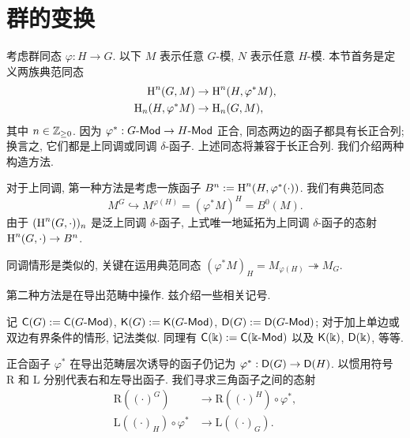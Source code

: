 \section{群的变换}\label{sec:change-of-group}
考虑群同态 $\varphi: H \to G$. 以下 $M$ 表示任意 $G$-模, $N$ 表示任意 $H$-模. 本节首务是定义两族典范同态
\begin{equation}\label{eqn:change-of-group-coh}\begin{aligned}
	\operatorname{H}^n(G, M) & \to \operatorname{H}^n(H, \varphi^* M), \\
	\operatorname{H}_n(H, \varphi^* M) & \to \operatorname{H}_n(G, M),
\end{aligned}\end{equation}
其中 $n \in \mathbb{Z}_{\geq 0}$. 因为 $\varphi^*: G\text{-}\mathsf{Mod} \to H\text{-}\mathsf{Mod}$ 正合, 同态两边的函子都具有长正合列; 换言之, 它们都是上同调或同调 $\delta$-函子. 上述同态将兼容于长正合列. 我们介绍两种构造方法.

对于上同调, 第一种方法是考虑一族函子 $B^n := \operatorname{H}^n(H, \varphi^* (\cdot))$. 我们有典范同态
\[ M^G \hookrightarrow M^{\varphi(H)} = (\varphi^* M)^H =  B^0(M). \]
由于 $(\operatorname{H}^n(G, \cdot))_n$ 是泛上同调 $\delta$-函子, 上式唯一地延拓为上同调 $\delta$-函子的态射 $\operatorname{H}^n(G, \cdot) \to B^n$.

同调情形是类似的, 关键在运用典范同态 $(\varphi^* M)_H = M_{\varphi(H)} \twoheadrightarrow M_G$.

第二种方法是在导出范畴中操作. 兹介绍一些相关记号.

\begin{convention}
	记 $\mathsf{C}(G) := \mathsf{C}(G\text{-}\mathsf{Mod})$, $\mathsf{K}(G) := \mathsf{K}(G\text{-}\mathsf{Mod})$, $\mathsf{D}(G) := \mathsf{D}(G\text{-}\mathsf{Mod})$; 对于加上单边或双边有界条件的情形, 记法类似. 同理有 $\mathsf{C}(\Bbbk) := \mathsf{C}(\Bbbk\text{-}\mathsf{Mod})$ 以及 $\mathsf{K}(\Bbbk)$, $\mathsf{D}(\Bbbk)$, 等等.
\end{convention}

正合函子 $\varphi^*$ 在导出范畴层次诱导的函子仍记为 $\varphi^*: \mathsf{D}(G) \to \mathsf{D}(H)$. 以惯用符号 $\mathrm{R}$ 和 $\mathrm{L}$ 分别代表右和左导出函子. 我们寻求三角函子之间的态射
\begin{align*}
	\mathrm{R}\left( (\cdot)^G \right) & \to \mathrm{R}\left( (\cdot)^H \right) \circ \varphi^* , \\
	\mathrm{L}\left( (\cdot)_H \right) \circ \varphi^* & \to \mathrm{L}\left((\cdot)_G \right).
\end{align*}

